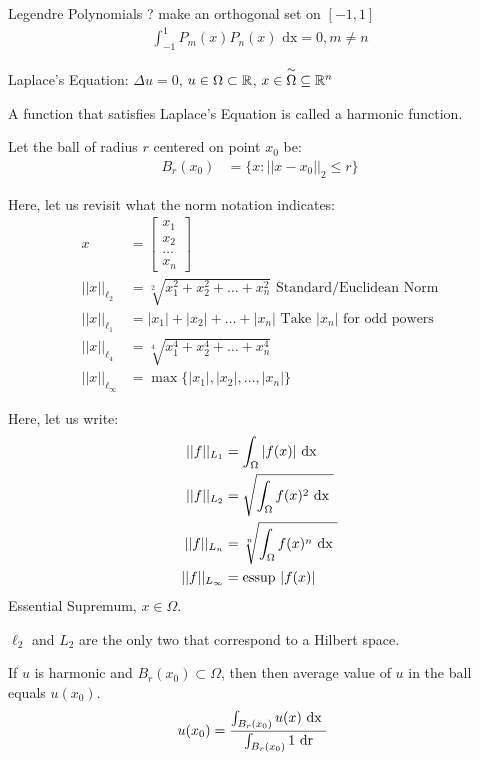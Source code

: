 \documentclass{article}
\newcommand{\twiddle}[1]{\overset{\sim}{#1}}
\begin{document}
Legendre Polynomials ? make an orthogonal set on $[-1, 1]$
%
\begin{align}
  \int^1_{-1} P_m(x) P_n(x) \text{ dx} = 0, m \neq n
\end{align}

Laplace's Equation: $\Delta u = 0$, $u \in \Omega \subset \mathbb R$, $x \in \twiddle{\Omega} \subseteq \R^n$

\dfn A function that satisfies Laplace's Equation is called a harmonic function.

\dfn Let the ball of radius $r$ centered on point $x_0$ be:
%
\begin{align}
  B_r(x_0) & = \{x : ||x - x_0||_2 \leq r \}
\end{align}

Here, let us revisit what the norm notation indicates:
%
\begin{align}
  x & =
  \begin{bmatrix}
    x_1\\
    x_2\\
    \ldots\\
    x_n
  \end{bmatrix}\\
  ||x||_{\ell_2} & = \sqrt[2]{x^2_1 + x^2_2 + \ldots + x^2_n} \text{ Standard/Euclidean Norm}\\
  ||x||_{\ell_1} & = |x_1| + |x_2| + \ldots + |x_n| \text{ Take $|x_n|$ for odd powers}\\
  ||x||_{\ell_4} & = \sqrt[4]{x^4_1 + x^4_2 + \ldots + x^4_n}\\
  ||x||_{\ell_\infty} & = \max\{ |x_1|, |x_2|, \ldots, |x_n| \}
\end{align}

Here, let us write:
%
\begin{align}
  ||f||_{L_1} & = \int_\Omega |f(x)| \text{ dx }\\
  ||f||_{L_2} & = \sqrt{\int_\Omega f(x)^2 \text{ dx }}\\
  ||f||_{L_n} & = \sqrt[n]{\int_\Omega f(x)^n \text{ dx }}\\
  ||f||_{L_\infty} & = \text{essup } |f(x)|
\end{align}
Essential Supremum, $x \in \Omega$.

$\ell_2$ and $L_2$ are the only two that correspond to a Hilbert space.

\thm If $u$ is harmonic and $B_r(x_0) \subset \Omega$, then then average value of $u$ in the ball equals $u(x_0)$.
%
\begin{align}
  u(x_0) & = \frac
  {
    \int_{B_r(x_0)} u(x) \text{ dx }
  }
  {
    \int_{B_r(x_0)} 1 \text{ dr}
  }
\end{align}
\end{document}
